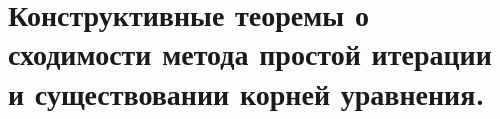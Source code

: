 \section{Конструктивные теоремы о сходимости метода простой итерации и существовании корней уравнения.}
